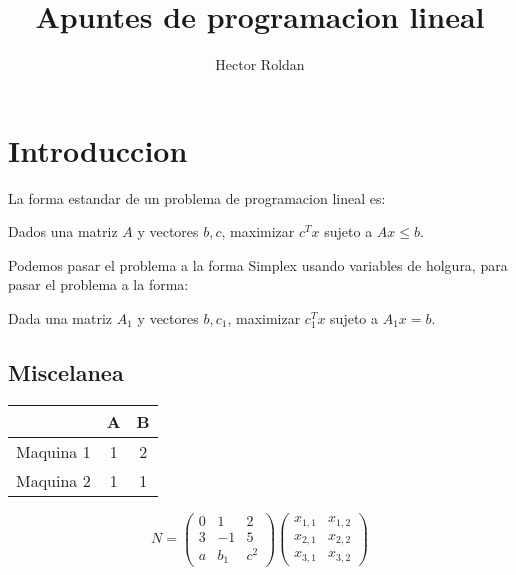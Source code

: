 \documentclass{article}
\title{Apuntes de programacion lineal}
\author{Hector Roldan}
\begin{document}
\maketitle
\tableofcontents

\section{Introduccion}
\label{sec:introduccion}


La forma estandar de un problema de programacion lineal es:


Dados una matriz $A$ y vectores $b,c$, maximizar $c^Tx$ sujeto a
$Ax\leq b$.

Podemos pasar el problema a la forma Simplex usando variables de
holgura, para pasar el problema a la forma:

Dada una matriz $A_1$ y vectores $b,c_1$, maximizar $c_1^Tx$ sujeto a $A_1x=b$.

\subsection{Miscelanea}
\label{sec:miscelanea}


\begin{tabular}{c|c|c}
  &A&B\\
  \hline
  Maquina 1&1&2\\
  Maquina 2&1&1
\end{tabular}
\begin{equation}
  \label{eq:1}
  N=
  \begin{pmatrix}
    0&1&2\\
    3&-1&5\\
    a&b_1&c^2
  \end{pmatrix}
  \begin{pmatrix}
    x_{1,1}&x_{1,2}\\
    x_{2,1}&x_{2,2}\\
    x_{3,1}&x_{3,2}
  \end{pmatrix}
\end{equation}
\end{document}
